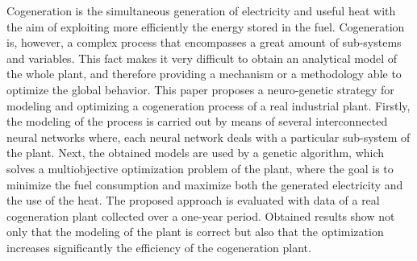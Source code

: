 Cogeneration is the simultaneous generation of electricity and useful heat with the aim of exploiting more efficiently the energy stored in the fuel. Cogeneration is, however, a complex process that encompasses a great amount of sub-systems and variables. This fact makes it very difficult to obtain an analytical model of the whole plant, and therefore providing a mechanism or a methodology able to optimize the global behavior. This paper proposes a neuro-genetic strategy for modeling and optimizing a cogeneration process of a real industrial plant. Firstly, the modeling of the process is carried out by means of several interconnected neural networks where, each neural network deals with a particular sub-system of the plant. Next, the obtained models are used by a genetic algorithm, which solves a multiobjective optimization problem of the plant, where the goal is to minimize the fuel consumption and maximize both the generated electricity and the use of the heat. The proposed approach is evaluated with data of a real cogeneration plant collected over a one-year period. Obtained results show not only that the modeling of the plant is correct but also that the optimization increases significantly the efficiency of the cogeneration plant.
